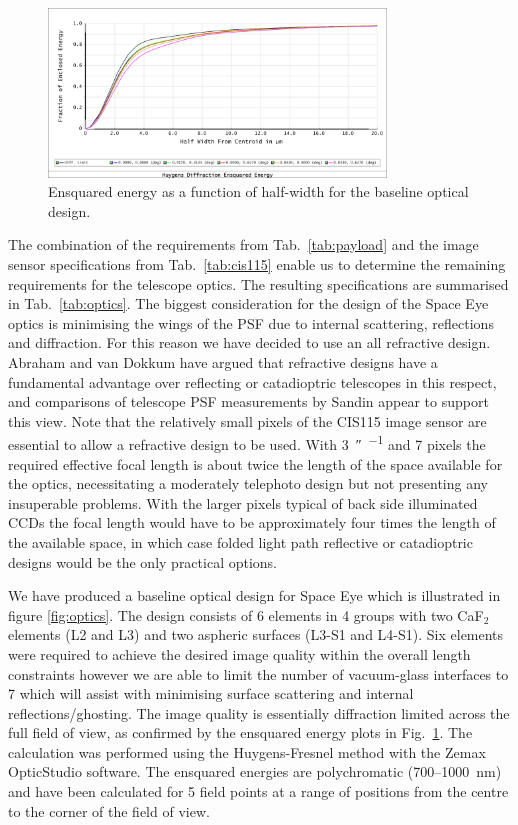 \documentclass[]{iac}
\begin{document}
\begin{figure}[p]
  \center \includegraphics[width=0.8\textwidth]{figures/ensquared.png}
  \caption{\label{fig:ensquared}Ensquared energy as a function of half-width for the baseline optical design.}
\end{figure}

The combination of the requirements from Tab.~\ref{tab:payload} and the image sensor specifications from
Tab.~\ref{tab:cis115} enable us to determine the remaining requirements for the telescope optics. The resulting
specifications are summarised in Tab.~\ref{tab:optics}. The biggest consideration for the design of the Space Eye optics
is minimising the wings of the PSF due to internal scattering, reflections and diffraction. For this reason we have
decided to use an all refractive design. Abraham and van Dokkum\cite{Abraham2014} have argued that refractive designs
have a fundamental advantage over reflecting or catadioptric telescopes in this respect, and comparisons of telescope
PSF measurements by Sandin\cite{Sandin2014} appear to support this view. Note that the relatively small pixels of the
CIS115 image sensor are essential to allow a refractive design to be used. With \SI{3}{\arcsecond\per\pix} and
\SI{7}{\micron} pixels the required effective focal length is about twice the length of the space available for the
optics, necessitating a moderately telephoto design but not presenting any insuperable problems. With the larger pixels
typical of back side illuminated CCDs the focal length would have to be approximately four times the length of the
available space, in which case folded light path reflective or catadioptric designs would be the only practical options.

We have produced a baseline optical design for Space Eye which is illustrated in figure \ref{fig:optics}. The design
consists of 6 elements in 4 groups with two CaF$_2$ elements (L2 and L3) and two aspheric surfaces (L3-S1 and L4-S1).
Six elements were required to achieve the desired image quality within the overall length constraints however we are
able to limit the number of vacuum-glass interfaces to 7 which will assist with minimising surface scattering and
internal reflections/ghosting. The image quality is essentially diffraction limited across the full field of view, as
confirmed by the ensquared energy plots in Fig.~\ref{fig:ensquared}. The calculation was performed using the
Huygens-Fresnel method with the Zemax OpticStudio software. The ensquared energies are polychromatic
(700--\SI{1000}{\nano\metre}) and have been calculated for 5 field points at a range of positions from the centre to the
corner of the field of view.
\end{document}
